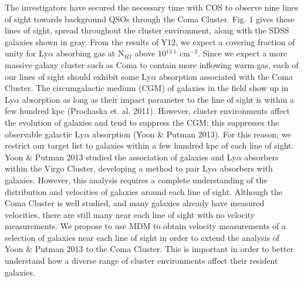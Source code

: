 The investigators have secured the necessary time with COS to observe nine 
lines of sight towards background QSOs through the Coma Cluster. Fig. 1
gives these lines of sight, spread throughout the cluster environment, along
with the SDSS galaxies shown in gray.
From the results of Y12, we expect a covering
fraction of unity for Ly$\alpha$ absorbing gas at N$_{HI}$ above 10$^{13.1}$ cm$^{-2}$.
Since we expect a more massive galaxy cluster such as Coma to contain more 
inflowing warm gas, each of our lines of sight should exhibit some Ly$\alpha$ 
absorption associated with the Coma Cluster. The circumgalactic medium (CGM)
of galaxies in the field show up in Ly$\alpha$ absorption
as long as their impact parameter to the line of sight is within a few hundred kpc
(Prochaska et. al. 2011). However, cluster environments affect the evolution of 
galaxies and tend to suppress the CGM; this suppresses the observable galactic
Ly$\alpha$ absorption (Yoon \& Putman 2013). For this reason, we restrict our
target list to galaxies within a few hundred kpc of each line of sight.
Yoon \& Putman 2013 studied the 
association of galaxies and Ly$\alpha$ absorbers within the Virgo Cluster, 
developing a method to pair Ly$\alpha$ absorbers with galaxies. However, this
analysis requires a complete understanding of the distribution and velocities
of galaxies around each line of sight. Although the Coma Cluster is well studied,
and many galaxies already have measured velocities, there are still many near
each line of sight with no velocity measurements. We propose to use MDM to obtain
velocity measurements of a selection of galaxies near each line of sight in
order to extend the analysis of Yoon \& Putman 2013 to the Coma Cluster. This 
is important in order to better understand how a diverse range of cluster 
environments affect their resident galaxies.


